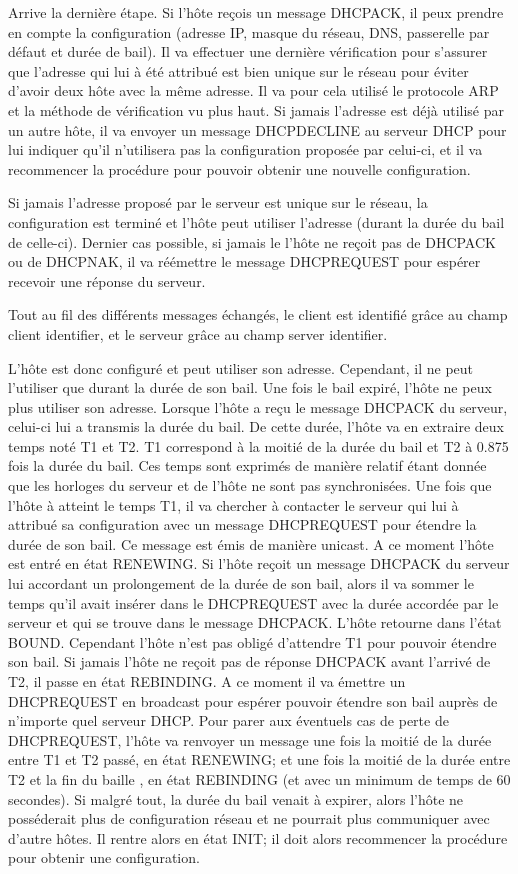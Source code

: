 Arrive la dernière étape.
Si l'hôte reçois un message DHCPACK, il peux prendre en compte la
configuration (adresse IP, masque du réseau, DNS, passerelle par défaut et
durée de bail). Il va effectuer une dernière vérification pour s'assurer que
l'adresse qui lui à été attribué est bien unique sur le réseau pour éviter
d'avoir deux hôte avec la même adresse. Il va pour cela utilisé le protocole
ARP et la méthode de vérification vu plus haut. Si jamais l'adresse est déjà
utilisé par un autre hôte, il va envoyer un message DHCPDECLINE au serveur DHCP
pour lui indiquer qu'il n'utilisera pas la configuration proposée par celui-ci,
et il va recommencer la procédure pour pouvoir obtenir une nouvelle
configuration.

Si jamais l'adresse proposé par le serveur est unique sur le réseau, la
configuration est terminé et l'hôte peut utiliser l'adresse (durant la durée du
bail de celle-ci).  Dernier cas possible, si jamais le l'hôte ne reçoit pas de
DHCPACK ou de DHCPNAK, il va réémettre le message DHCPREQUEST pour espérer
recevoir une réponse du serveur.

Tout au fil des différents messages échangés, le client est identifié grâce au
champ client identifier, et le serveur grâce au champ server identifier.

L'hôte est donc configuré et peut utiliser son adresse. Cependant, il ne peut
l'utiliser que durant la durée de son bail. Une fois le bail expiré, l'hôte ne
peux plus utiliser son adresse. Lorsque l'hôte a reçu le message DHCPACK du
serveur, celui-ci lui a transmis la durée du bail. De cette durée, l'hôte va
en extraire deux temps noté T1 et T2. T1 correspond à la moitié de la durée du
bail et T2 à 0.875 fois la durée du bail. Ces temps sont exprimés de manière relatif
étant donnée que les horloges du serveur et de l'hôte ne sont pas
synchronisées.  Une fois que l'hôte à atteint le temps T1, il va chercher à
contacter le serveur qui lui à attribué sa configuration avec un message
DHCPREQUEST pour étendre la durée de son bail. Ce message est émis de manière
unicast. A ce moment l'hôte est entré en état RENEWING. Si l'hôte reçoit un
message DHCPACK du serveur lui accordant un prolongement de la durée de son
bail, alors il va sommer le temps qu'il avait insérer dans le DHCPREQUEST avec
la durée accordée par le serveur et qui se trouve dans le message DHCPACK.
L'hôte retourne dans l'état BOUND. Cependant l'hôte n'est pas obligé d'attendre
T1 pour pouvoir étendre son bail.  Si jamais l'hôte ne reçoit pas de réponse
DHCPACK avant l'arrivé de T2, il passe en état REBINDING. A ce moment il va
émettre un DHCPREQUEST en broadcast pour espérer pouvoir étendre son bail
auprès de n'importe quel serveur DHCP. Pour parer aux éventuels cas de perte de
DHCPREQUEST, l'hôte va renvoyer un message une fois la moitié de la durée entre
T1 et T2 passé, en état RENEWING; et une fois la moitié de la durée entre T2 et
la fin du baille , en état REBINDING (et avec un minimum de temps de 60
secondes).  Si malgré tout, la durée du bail venait à expirer, alors l'hôte ne
posséderait plus de configuration réseau et ne pourrait plus communiquer avec
d'autre hôtes. Il rentre alors en état INIT; il doit alors recommencer la
procédure pour obtenir une configuration.


